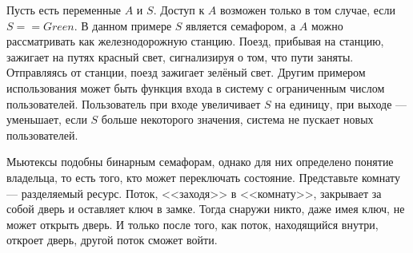 \documentclass{book}
\begin{document}
Пусть есть переменные $A$ и $S$. Доступ к $A$ возможен только в том случае, если $S
== Green$. В данном примере $S$ является семафором, а $A$ можно рассматривать
как железнодорожную станцию. Поезд, прибывая на станцию, зажигает на путях
красный свет, сигнализируя о том, что пути заняты. Отправляясь от станции, поезд
зажигает зелёный свет. Другим примером использования может быть функция входа в
систему с ограниченным числом пользователей. Пользователь при входе увеличивает
$S$ на единицу, при выходе --- уменьшает, если $S$ больше некоторого значения,
система не пускает новых пользователей.

Мьютексы подобны бинарным семафорам, однако для них определено понятие
владельца, то есть того, кто может переключать состояние. Представьте комнату
--- разделяемый ресурс. Поток, <<заходя>> в <<комнату>>, закрывает за собой
дверь и оставляет ключ в замке. Тогда снаружи никто, даже имея ключ, не может
открыть дверь. И только после того, как поток, находящийся внутри, откроет дверь,
другой поток сможет войти.
\end{document}
